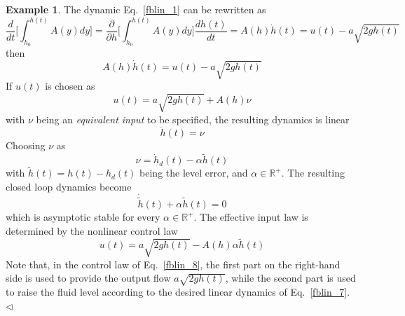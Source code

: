 \documentclass[11pt,a4paper,oneside]{book}
\numberwithin{equation}{section}
\theoremstyle{it}
\theoremstyle{definition}
\newtheorem{example}{Example}[chapter]
\begin{document}
\begin{itemize}
{\begin{example}
			The dynamic Eq.~\ref{fblin_1} can be rewritten as 
			\begin{equation}\label{fblin_2}
				\frac{d}{dt}\Big[\int_{h_0}^{h(t)}A(y)dy\Big] = 
				\frac{\partial}{\partial 
					h}\Big[\int_{h_0}^{h(t)}A(y)dy\Big]\frac{dh(t)}{dt} = 
				A(h)\dot{h}(t)=u(t)-a\sqrt{2gh(t)}
			\end{equation}
			then
			\begin{equation}\label{fblin_3}
				A(h)\dot{h}(t)=u(t)-a\sqrt{2gh(t)}
			\end{equation}
			If $u(t)$ is chosen as 
			\begin{equation}\label{fblin_4}
				u(t) = a\sqrt{2gh(t)} + A(h)\nu
			\end{equation}
			with $\nu$ being an \textit{equivalent input} to be specified, the 
			resulting dynamics is linear
			\begin{equation}\label{fblin_5}
				\dot{h}(t) = \nu
			\end{equation}
			Choosing $\nu$ as
			\begin{equation}\label{fblin_6}
				\nu=\dot{h}_d(t) - \alpha\tilde{h}(t)
			\end{equation}
			with $\tilde{h}(t) = h(t)-h_d(t)$ being the level error, and 
			$\alpha\in\mathbb{R}^+$. The resulting closed loop dynamics become 
			\begin{equation}\label{fblin_7}
				\dot{\tilde{h}}(t) + \alpha\tilde{h}(t)=0
			\end{equation}
			which is asymptotic stable for every $\alpha\in\mathbb{R}^+$. The 
			effective input law is determined by the nonlinear control law
			\begin{equation}\label{fblin_8}
				u(t) = a\sqrt{2gh(t)} - A(h)\alpha\tilde{h}(t)
			\end{equation}
			Note that, in the control law of Eq.~\ref{fblin_8}, the first part 
			on the right-hand side is used to provide the output flow 
			$a\sqrt{2gh(t)}$, while the second part is used to raise the fluid 
			level according to the desired linear dynamics of Eq.~\ref{fblin_7}.
			$\triangleleft$ 
		\end{example}  
	}
\end{itemize}
\end{document}
